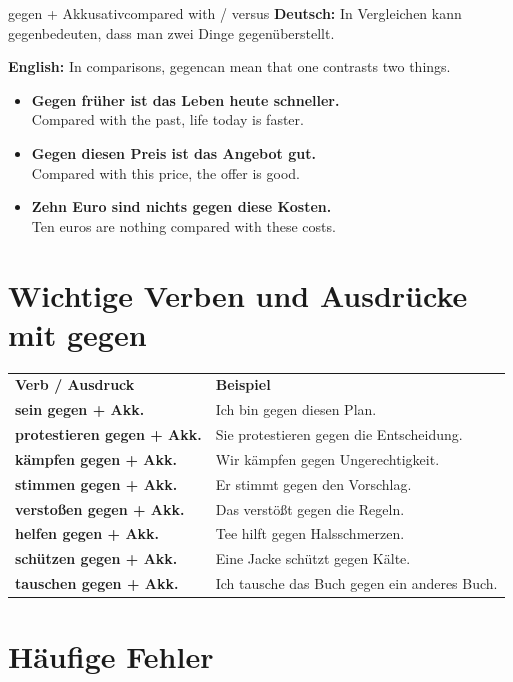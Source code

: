 \documentclass[a4paper,11pt]{article}
\newcommand{\GermanText}[1]{\textbf{Deutsch: }#1\par}
\newcommand{\EnglishText}[1]{{\small\color{SoftGray}\textbf{English: }#1\par}}
\newcommand{\ExampleItem}[2]{\item \textbf{#1}\\{\small\color{SoftGray}#2}}
\begin{document}
\begin{grammarentry}{gegen + Akkusativ}{compared with / versus}
\GermanText{In Vergleichen kann \glqq gegen\grqq bedeuten, dass man zwei Dinge gegenüberstellt.}
\EnglishText{In comparisons, \glqq gegen\grqq can mean that one contrasts two things.}
\end{grammarentry}

\begin{exbox}
\begin{itemize}
    \ExampleItem{Gegen früher ist das Leben heute schneller.}{Compared with the past, life today is faster.}
    \ExampleItem{Gegen diesen Preis ist das Angebot gut.}{Compared with this price, the offer is good.}
    \ExampleItem{Zehn Euro sind nichts gegen diese Kosten.}{Ten euros are nothing compared with these costs.}
\end{itemize}
\end{exbox}

\section{Wichtige Verben und Ausdrücke mit gegen}

\begin{tabularx}{\textwidth}{>{\bfseries}p{}X}
\rowcolor{HeaderBlueDark}
\color{white}\textbf{Verb / Ausdruck} & \color{white}\textbf{Beispiel} \\
sein gegen + Akk. & Ich bin gegen diesen Plan. \\
protestieren gegen + Akk. & Sie protestieren gegen die Entscheidung. \\
kämpfen gegen + Akk. & Wir kämpfen gegen Ungerechtigkeit. \\
stimmen gegen + Akk. & Er stimmt gegen den Vorschlag. \\
verstoßen gegen + Akk. & Das verstößt gegen die Regeln. \\
helfen gegen + Akk. & Tee hilft gegen Halsschmerzen. \\
schützen gegen + Akk. & Eine Jacke schützt gegen Kälte. \\
tauschen gegen + Akk. & Ich tausche das Buch gegen ein anderes Buch. \\
\end{tabularx}

\section{Häufige Fehler}
\end{document}
